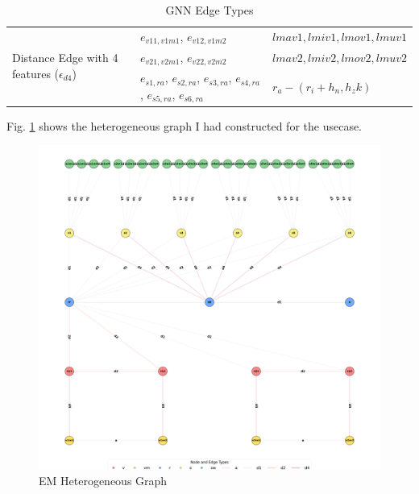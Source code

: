 \documentclass{report} %
\begin{document}
\begin{enumerate}
\begin{table}[H]
\begin{tabular}{|p{}|p{}|p{}|}
        \hline
        \multirow{3}{0.2\textwidth}{Distance Edge with 4 features (\( \epsilon_{d4} \))} & \( e_{v11, v1m1} \), \( e_{v12, v1m2} \) & $lmav1, lmiv1, lmov1, lmuv1$ \\
                                            &  \( e_{v21, v2m1} \), \( e_{v22, v2m2} \) & $lmav2, lmiv2, lmov2, lmuv2$ \\
                                            &  \( e_{s1, ra} \), \( e_{s2, ra} \), \( e_{s3, ra} \), \( e_{s4, ra} \), \( e_{s5, ra} \), \( e_{s6, ra} \)   &  \(r_a - (r_i + h_n, h_zk) \)\\

        \hline
        \end{tabular}
        \caption{\ac{GNN} Edge Types}
        \label{tab:GNN Edge Types}
    \end{table}

\end{enumerate}

Fig. \ref{fig:HetGraph} shows the heterogeneous graph I had constructed for the usecase.
\begin{figure}[H]
    \centering
    \includegraphics[width=1\textwidth]{./ReportImages/graph.png} 
    \caption{\ac{EM} Heterogeneous Graph}
    \label{fig:HetGraph}
\end{figure}

\listoffigures
\end{document}
